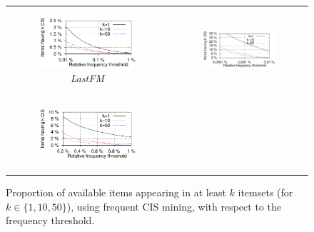 \begin{figure}
	\centering
	\begin{tabular}{cc}
		\begin{subfigure}[b]{0.48\textwidth}
			\includegraphics{fig/toppi/classic-vs-topPI/nbTopK-classic-lastfm.pdf}
			\caption{\em LastFM}
		\end{subfigure}
		&
		\begin{subfigure}[b]{0.48\textwidth}
			\includegraphics{fig/toppi/classic-vs-topPI/nbTopK-classic-tickets2013.pdf}
			\caption{\prodassocreceipt}
		\end{subfigure}
		\\
		\begin{subfigure}[b]{0.48\textwidth}
			\includegraphics{fig/toppi/classic-vs-topPI/nbTopK-classic-tickets2013-perClient.pdf}
			\caption{\prodassocclient}
		\end{subfigure}
		&
		\hfill
		\begin{minipage}[b]{0.40\linewidth}
			\caption{\label{fig:classicCoverage}
				Proportion of available items appearing in at least $k$ itemsets (for $k \in \{1, 10, 50\}$),
				using frequent CIS mining,
				with respect to the frequency threshold.
			}
		\end{minipage}
		\\
	\end{tabular}
\end{figure}


